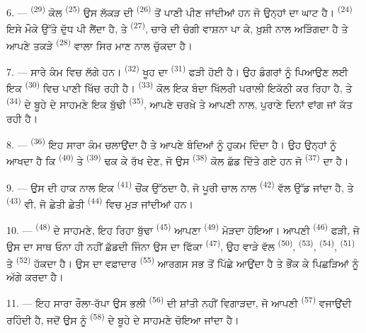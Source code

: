 6. ---  \textsuperscript{(29)} ਕੋਲ 
\textsuperscript{(25)} ਉਸ ਲੱਕੜ ਦੀ  \textsuperscript{(26)} ਤੋਂ ਪਾਣੀ
ਪੀਣ ਜਾਂਦੀਆਂ ਹਨ ਜੋ ਉਨ੍ਹਾਂ ਦਾ ਘਾਟ ਹੈ।  \textsuperscript{(24)} ਇਸੇ ਮੌਕੇ
ਉੱਤੇ ਦੁੱਧ ਪੀ ਲੈਂਦਾ ਹੈ, ਤੇ  \textsuperscript{(27)}, ਚਾਰੇ ਦੀ ਚੰਗੀ ਵਾਸ਼ਨਾ
ਪਾ ਕੇ, ਖ਼ੁਸ਼ੀ ਨਾਲ ਅੜਿੰਗਦਾ ਹੈ ਤੇ ਆਪਣੇ ਤਕੜੇ  \textsuperscript{(28)}
ਵਾਲਾ ਸਿਰ ਮਾਣ ਨਾਲ ਚੁੱਕਦਾ ਹੈ।

7. --- ਸਾਰੇ ਕੰਮ ਵਿਚ ਲੱਗੇ ਹਨ।  \textsuperscript{(32)} ਖੂਹ ਦਾ
 \textsuperscript{(31)} ਫੜੀ ਹੋਈ ਹੈ। ਉਹ ਡੰਗਰਾਂ ਨੂੰ ਪਿਆਉਣ ਲਈ ਇਕ
 \textsuperscript{(30)} ਵਿਚ ਪਾਣੀ ਖਿੱਚ ਰਹੀ ਹੈ। 
\textsuperscript{(33)} ਕੋਲ ਇਕ ਬੰਦਾ ਖਿੱਲਰੀ ਪਰਾਲੀ ਇਕੱਠੀ ਕਰ ਰਿਹਾ ਹੈ, ਤੇ
 \textsuperscript{(34)} ਦੇ ਬੂਹੇ ਦੇ ਸਾਹਮਣੇ ਇਕ ਬੁੱਢੀ
 \textsuperscript{(35)}, ਆਪਣੇ ਚਰਖ਼ੇ ਤੇ ਆਪਣੀ  ਨਾਲ,
ਪੁਰਾਣੇ ਦਿਨਾਂ ਵਾਂਗ  ਜਾਂ  ਕੱਤ ਰਹੀ ਹੈ।

\VUsaut{3.0mm}
\VUsaut{3.0mm}

8. ---  \textsuperscript{(36)} ਇਹ ਸਾਰਾ ਕੰਮ ਚਲਾਉਂਦਾ ਹੈ ਤੇ ਆਪਣੇ
ਬੰਦਿਆਂ ਨੂੰ ਹੁਕਮ ਦਿੰਦਾ ਹੈ। ਉਹ ਉਨ੍ਹਾਂ ਨੂੰ ਆਖਦਾ ਹੈ ਕਿ 
\textsuperscript{(40)} ਤੇ  \textsuperscript{(39)} ਢਕ ਕੇ ਰੱਖ ਦੇਣ, ਜੋ ਉਸ
 \textsuperscript{(38)} ਕੋਲ ਛੱਡ ਦਿੱਤੇ ਗਏ ਹਨ ਜੋ 
\textsuperscript{(37)} ਦਾ ਹੈ।

9. --- ਉਸ ਦੀ ਹਾਕ ਨਾਲ ਇਕ  \textsuperscript{(41)} ਚੌਂਕ ਉੱਠਦਾ ਹੈ, ਜੋ
ਪੂਰੀ ਚਾਲ ਨਾਲ  \textsuperscript{(42)} ਵੱਲ ਉੱਡ ਜਾਂਦਾ ਹੈ, ਤੇ
 \textsuperscript{(43)} ਵੀ, ਜੋ ਛੇਤੀ ਛੇਤੀ 
\textsuperscript{(44)} ਵਿਚ ਮੁੜ ਜਾਂਦੀਆਂ ਹਨ।

10. ---  \textsuperscript{(48)} ਦੇ ਸਾਹਮਣੇ, ਇਹ ਰਿਹਾ ਬੁੱਢਾ
 \textsuperscript{(45)} ਆਪਣਾ  \textsuperscript{(49)}
ਮੋੜਦਾ ਹੋਇਆ। ਆਪਣੀ  \textsuperscript{(46)} ਫੜੀ, ਜੋ ਉਸ ਦਾ ਸਾਥ ਓਨਾ ਹੀ ਨਹੀਂ
ਛੱਡਦੀ ਜਿੰਨਾ ਉਸ ਦਾ ਫਿੱਕਾ  \textsuperscript{(47)}, ਉਹ ਵਾੜੇ ਵੱਲ
 \textsuperscript{(50)},  \textsuperscript{(53)},
 \textsuperscript{(54)},  \textsuperscript{(51)} ਤੇ
 \textsuperscript{(52)} ਹੱਕਦਾ ਹੈ। ਉਸ ਦਾ ਵਫ਼ਾਦਾਰ
 \textsuperscript{(55)} ਆਰਗਸ ਸਭ ਤੋਂ ਪਿੱਛੇ ਆਉਂਦਾ ਹੈ ਤੇ ਭੌਂਕ ਕੇ
ਪਿਛੜਿਆਂ ਨੂੰ ਅੱਗੇ ਕਰਦਾ ਹੈ।

11. --- ਇਹ ਸਾਰਾ ਰੌਲਾ-ਰੱਪਾ ਉਸ ਭਲੀ  \textsuperscript{(56)} ਦੀ
ਸ਼ਾਂਤੀ ਨਹੀਂ ਵਿਗਾੜਦਾ, ਜੋ ਆਪਣੀ  \textsuperscript{(57)} ਵਜਾਉਂਦੀ ਰਹਿੰਦੀ
ਹੈ, ਜਦੋਂ ਉਸ ਨੂੰ  \textsuperscript{(58)} ਦੇ ਬੂਹੇ ਦੇ ਸਾਹਮਣੇ ਚੋਇਆ
ਜਾਂਦਾ ਹੈ।


